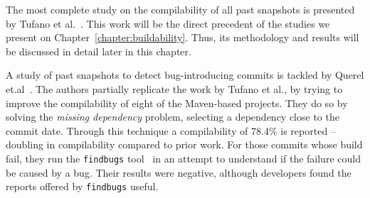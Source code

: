 The most complete study on the compilability of all past snapshots is presented by Tufano et al.~\cite{tufano2017there}.
This work will be the direct precedent of the studies we present on Chapter~\ref{chapter:buildability}. 
Thus, its methodology and results will be discussed in detail later in this chapter.

A study of past snapshots to detect bug-introducing commits is tackled by Querel et.al~\cite{querel:2021:warning}. 
The authors partially replicate the work by Tufano et al., by trying to improve the compilability of eight of the Maven-based projects. 
They do so by solving the \textit{missing dependency} problem, selecting a dependency close to the commit date. 
Through this technique a compilability of 78.4\% is reported -- doubling in compilability compared to prior work. For those commits whose build fail, they run the \texttt{findbugs} tool~\cite{ayewah2007using} in an attempt to understand if the failure could be caused by a bug. 
Their results were negative, although developers found the reports offered by \texttt{findbugs} useful.
